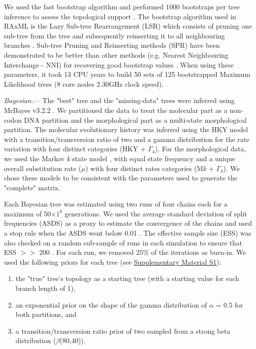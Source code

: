 \documentclass[12pt,letterpaper]{article}
\renewcommand{\subsubsection}[1]{%
\vspace{2ex}
\noindent
\textit{#1.}---}
\begin{document}
We used the fast bootstrap algorithm and performed 1000 bootstraps per tree inference to assess the topological support \citep{pattengale2010many}. %
The bootstrap algorithm used in RAxML is the Lazy Sub-tree Rearrangement (LSR) which consists of pruning one sub-tree from the tree and subsequently reinserting it to all neighbouring branches \citep{stamatakisa2008}.
Sub-tree Pruning and Reinserting methods (SPR) have been demonstrated to be better than other methods (e.g. Nearest Neighbouring Interchange - NNI) for recovering good bootstrap values \citep{salamin2003}.
When using these parameters, it took 13 CPU years to build 50 sets of 125 bootstrapped Maximum Likelihood trees (8 core nodes 2.30GHz clock speed).

\subsubsection{Bayesian}
The "best" tree and the "missing-data" trees were inferred using MrBayes v3.2.2 \citep{Ronquist2012mrbayes}.
We partitioned the data to treat the molecular part as a non-codon DNA partition and the morphological part as a multi-state morphological partition.
The molecular evolutionary history was inferred using the HKY model with a transition/transversion ratio of two \citep{douadycomparison2003} and a gamma distribution for the rate variation with four distinct categories (HKY + $\Gamma_4$).
For the morphological data, we used the Markov \textit{k} state model \citep{lewisa2001}, with equal state frequency and a unique overall substitution rate ($\mu$) with four distinct rates categories (M\textit{k} + $\Gamma_4$).
We chose these models to be consistent with the parameters used to generate the "complete" matrix.

Each Bayesian tree was estimated using two runs of four chains each for a maximum of 50$\times$$1^6$ generations.
We used the average standard deviation of split frequencies (ASDS) as a proxy to estimate the convergence of the chains and used a stop rule when the ASDS went below 0.01 \citep{Ronquist2012mrbayes}.
The effective sample size (ESS) was also checked on a random sub-sample of runs in each simulation to ensure that ESS $>>$ 200 \citep{drummond2006ess}.
For each run, we removed 25\% of the iterations as burn-in.
We used the following priors for each tree (see \hyperref[SupplementaryMaterial]{Supplementary Material S1}):
\begin{enumerate}
\item the "true" tree’s topology as a starting tree (with a starting value for each branch length of 1),
\item an exponential prior on the shape of the gamma distribution of $\alpha$ = 0.5 for both partitions, and
\item a transition/transversion ratio prior of two sampled from a strong beta distribution ($\beta$(80,40)).
\end{enumerate}
\end{document}
